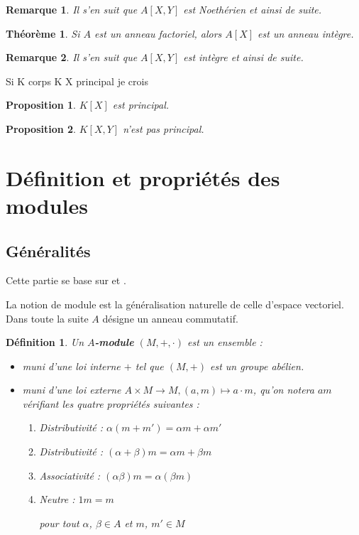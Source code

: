 \documentclass[a4paper,12pt]{report}  %
\theoremstyle{definitionstyle}
\newtheorem{definition}{Définition}[chapter] %
\theoremstyle{examplestyle}
\theoremstyle{remarkstyle}
\newtheorem{remark}{Remarque}[chapter] %
\theoremstyle{propositionstyle}
\newtheorem{proposition}{Proposition}[chapter]  %
\theoremstyle{theoremstyle}
\newtheorem{theoreme}{Théorème}[chapter]  %
\begin{document}
	\begin{remark}
		Il s'en suit que $A[X, Y]$ est Noethérien et ainsi de suite.
	\end{remark}

	\begin{theoreme}
		Si $A$ est un anneau factoriel, alors $A[X]$ est un anneau intègre.
	\end{theoreme}
	
	\begin{remark}
		Il s'en suit que $A[X, Y]$ est intègre et ainsi de suite.
	\end{remark}

	Si K corps K X principal je crois
	
	\begin{proposition}
		$K[X]$ est principal.
	\end{proposition}

	\begin{proposition}
		$K[X, Y]$ n'est pas principal.
	\end{proposition}
	
	\section{Définition et propriétés des modules} %
	
	\subsection{Généralités}
	Cette partie se base sur \cite{ring_modules} et \cite{harari_modules}.
	
	La notion de module est la généralisation naturelle de celle d'espace vectoriel. Dans toute la suite $A$ désigne un anneau commutatif.
	
	\begin{definition}
		Un \textbf{$A$-module} $(M, +, \cdot)$ est un ensemble :
		
		\begin{itemize}
			\item muni d'une loi interne $+$ tel que $(M, +)$ est un groupe abélien.
			\item muni d'une loi externe $A \times M \rightarrow M, (a, m) \mapsto a \cdot m$, qu'on notera $am$ vérifiant les quatre propriétés suivantes :
			\begin{enumerate}
				\item Distributivité : $\alpha(m + m') = \alpha m + \alpha m'$
				\item Distributivité : $(\alpha+\beta)m = \alpha m + \beta m$
				\item Associativité : $(\alpha \beta)m = \alpha(\beta m)$
				\item Neutre : $1m = m$
				
				pour tout $\alpha$, $\beta \in A$ et $m$, $m' \in M$
			\end{enumerate}
		\end{itemize}
	\end{definition}
	
\end{document}
